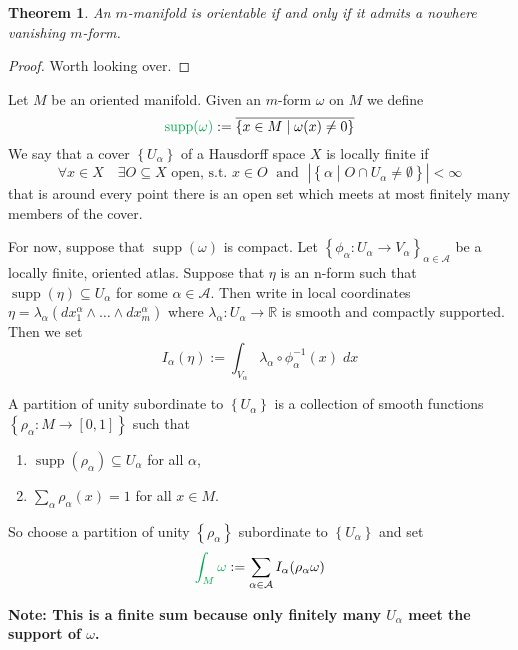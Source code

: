 \documentclass[11pt]{article}
\newcommand{\defeq}{:=}
\DeclareMathOperator{\supp}{\mathrm{supp}}
\newcommand{\relmiddle}[1]{\mathrel{}\middle#1\mathrel{}}
\newcommand{\rmv}{\relmiddle|}
\newcommand{\R}{\mathbb{R}}
\newenvironment{defin}
	{\begin{mdframed}[backgroundcolor=white, roundcorner=5pt, linewidth=1pt, linecolor=Green]
		\setlength{\parindent}{0pt}}
	{\end{mdframed}}
\newcommand{\mdf}[1]{{\color{Green} #1}}
\newenvironment{note}
	{\begin{mdframed}[backgroundcolor=white, linecolor=red, roundcorner=5pt, linewidth=1pt]\bfseries{Note:}\normalfont
	\setlength{\parindent}{0pt}}
	{\end{mdframed}}
\newtheorem{theorem}{Theorem}[section]
\begin{document}
\begin{theorem}
An $m$-manifold is orientable if and only if it admits a nowhere vanishing $m$-form.
\end{theorem}

\begin{proof}
Worth looking over.
\end{proof}

\begin{defin}
Let $M$ be an oriented manifold.
Given an $m$-form $\omega$ on $M$ we define
\[
\mdf{\supp(\omega)}\defeq\overline{\left\{ x\in M \rmv \omega(x) \neq 0\right\}}
\]
We say that a cover $\left\{ U_\alpha\right\}$ of a Hausdorff space $X$ is \mdf{locally finite} if
\[
	\forall x \in X \quad \exists O\subseteq X\text{ open, s.t. }x\in O \; \text{ and } \; \left|\left\{ \alpha \rmv O\cap U_\alpha\neq\emptyset\right\}\right|< \infty
\]
that is around every point there is an open set which meets at most finitely many members of the cover.
\end{defin}

For now, suppose that $\supp(\omega)$ is compact.
Let $\left\{ \phi_\alpha: U_\alpha \to V_\alpha\right\}_{\alpha\in\mathcal{A}}$ be a locally finite, oriented atlas.
Suppose that $\eta$ is an n-form such that $\supp(\eta)\subseteq U_\alpha$ for some $\alpha\in\mathcal{A}$.
Then write in local coordinates $\eta = \lambda_\alpha(dx_1^\alpha \wedge \dots \wedge dx_m^\alpha)$ where $\lambda_\alpha:U_\alpha\to\R$ is smooth and compactly supported.
Then we set
\[
	I_\alpha(\eta)\defeq \int_{V_\alpha} \lambda_\alpha \circ \phi_\alpha^{-1}(x) \; dx
\]

\begin{defin}
	A \mdf{partition of unity subordinate to} $\left\{ U_\alpha\right\}$ is a collection of smooth functions $\left\{ \rho_\alpha: M \to [0, 1]\right\}$ such that
	\begin{enumerate}
		\item $\supp(\rho_\alpha)\subseteq U_\alpha$ for all $\alpha$,
		\item $\sum_{\alpha}\rho_\alpha(x)=1$ for all $x\in M$.
	\end{enumerate}
\end{defin}

So choose a partition of unity $\left\{ \rho_\alpha\right\}$ subordinate to $\left\{ U_\alpha\right\}$ and set
\[
	\mdf{\int_M \omega} \defeq \sum_{\alpha\in\mathcal{A}} I_\alpha(\rho_\alpha \omega)
\]
\begin{note}
	This is a finite sum because only finitely many $U_\alpha$ meet the support of $\omega$.
\end{note}
\end{document}
